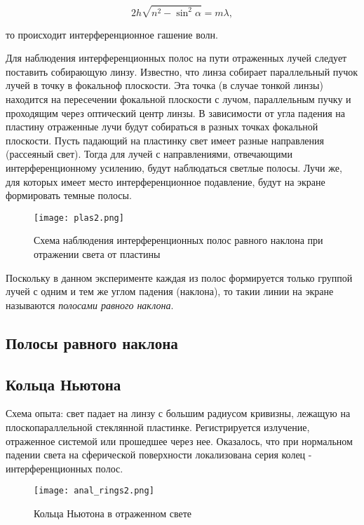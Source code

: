 \begin{equation*}
    2h\sqrt{n^2- \sin^2\alpha} = m\lambda ,
\end{equation*}

то происходит интерференционное гашение волн.

\medskip

Для наблюдения интерференционных полос на пути отраженных лучей следует поставить собирающую линзу.
Известно, что линза собирает параллельный пучок лучей в точку в фокальноф плоскости. Эта точка (в случае тонкой линзы) находится на пересечении фокальной плоскости с лучом, параллельным пучку и проходящим через оптический центр линзы. В зависимости от угла падения на пластину отраженные лучи будут собираться в разных точках фокальной плоскости. Пусть падающий на пластинку свет имеет разные направления (рассеяный свет). Тогда для лучей с направлениями, отвечающими интерференционному усилению, будут наблюдаться светлые полосы. Лучи же, для которых имеет место интерференционное подавление, будут на экране формировать темные полосы.


\begin{figure}[h!]
    \centering
    \texttt{[image: plas2.png]}
    \caption{Схема наблюдения интерференционных полос равного наклона при отражении света от пластины}
    \label{fig:my_label}
\end{figure} 
Поскольку в данном эксперименте каждая из полос формируется только группой лучей с одним и тем же углом падения (наклона), то такии линии на экране называются \textit{полосами равного наклона}.
\subsection{Полосы равного наклона}
\subsection{Кольца Ньютона}

Схема опыта: свет падает на линзу с большим радиусом кривизны, лежащую на плоскопараллельной стеклянной пластинке. Регистрируется излучение, отраженное системой или прошедшее через нее. Оказалось, что при нормальном падении света на сферической поверхности локализована серия колец - интерференционных полос.


\begin{figure}[h!]
    \centering
    \texttt{[image: anal\_rings2.png]}
    \caption{Кольца Ньютона в отраженном свете}
    \label{fig:my_label}
\end{figure} 


